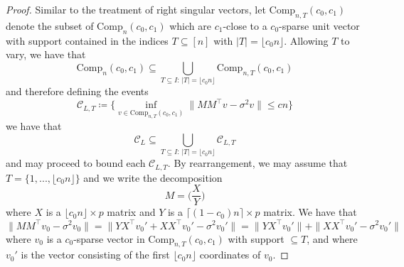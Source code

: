 \documentclass[10pt,a4paper]{amsart}
\newcommand{\Comp}{\mathrm{Comp}}
\begin{document}
\begin{proof}
   Similar to the treatment of right singular vectors, let $\Comp_{n, T}(c_0, c_1)$ denote the subset of $\Comp_{n}(c_0, c_1)$ which are $c_1$-close to a $c_0$-sparse unit vector with support contained in the indices $T \subseteq [n]$ with $|T| = \lfloor c_0 n \rfloor$. Allowing $T$ to vary, we have that
    \begin{equation*}
        \Comp_{n}(c_0, c_1) \subseteq \bigcup_{T \subseteq I : \, |T| = \lfloor c_0 n \rfloor}\Comp_{n, T}(c_0, c_1)
    \end{equation*}
    and therefore defining the events 
    \begin{equation*}
        \mathcal{C}_{L, T} \coloneqq \bigg\{ \inf_{v \in \Comp_{n, T}(c_0, c_1)}\|MM^\top v - \sigma^2 v\| \leq c n \bigg\}
    \end{equation*}
    we have that 
    \begin{equation*}
        \mathcal{C}_L \subseteq \bigcup_{T \subseteq I : \, |T| = \lfloor c_0 n \rfloor}\mathcal{C}_{L, T}
    \end{equation*}
    and may proceed to bound each $\mathcal{C}_{L, T}$. By rearrangement, we may assume that $T = \{ 1, ..., \lfloor c_0 n \rfloor \}$ and we write the decomposition 
    \begin{equation*}
        M = \bigg(\frac{X}{Y}\bigg)
    \end{equation*}
    where $X$ is a $\lfloor c_0 n \rfloor \times p$ matrix and $Y$ is a $\lceil(1 - c_0)n \rceil \times p$ matrix. We have that
    \begin{equation}\label{eq-left-compressible-decomp}
        \| MM^\top v_0 - \sigma^2 v_0\| = \|YX^\top v_0' + XX^\top v_0' - \sigma^2 v_0'\| = \|YX^\top v_0'\| + \|XX^\top v_0' - \sigma^2 v_0'\|
    \end{equation}
    where $v_0$ is a $c_0$-sparse vector in $\Comp_{n, T}(c_0, c_1)$ with support $\subseteq T$, and where $v_0'$ is the vector consisting of the first $\lfloor c_0 n \rfloor$ coordinates of $v_0$. 
    

\end{proof}
\end{document}
